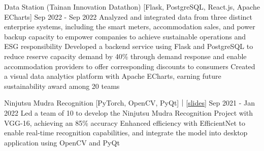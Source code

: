 
\resumeProjEntry
{Data Station (Tainan Innovation Datathon)}
{[Flask, PostgreSQL, React.js, Apache ECharts]}
{Sep 2022 - Sep 2022}
{
    \resumeItemListStart
        \resumeItem
        {Analyzed and integrated data from three distinct enterprise systems, including the smart meters, accommodation sales, and power backup capacity to empower companies to achieve sustainable operations and ESG responsibility}
        \resumeItem
        {Developed a backend service using Flask and PostgreSQL to reduce reserve capacity demand by 40\% through demand response and enable accommodation providers to offer corresponding discounts to consumers}
        \resumeItem
        {Created a visual data analytics platform with Apache ECharts, earning future sustainability award among 20 teams}
    \resumeItemListEnd
}

\resumeProjEntry
{Ninjutsu Mudra Recognition}
{[PyTorch, OpenCV, PyQt]｜[\href{https://docs.google.com/presentation/d/1uDKyUByoG-cLUBiKg4SqwVUj7In7w9YE/preview}{slides}]}
{Sep 2021 - Jan 2022}
{
    \resumeItemListStart
        \resumeItem
        {Led a team of 10 to develop the Ninjutsu Mudra Recognition Project with VGG-16, achieving an 85\% accuracy}
        \resumeItem
        {Enhanced efficiency with EfficientNet to enable real-time recognition capabilities, and integrate the model into desktop application using OpenCV and PyQt}
    \resumeItemListEnd
}
